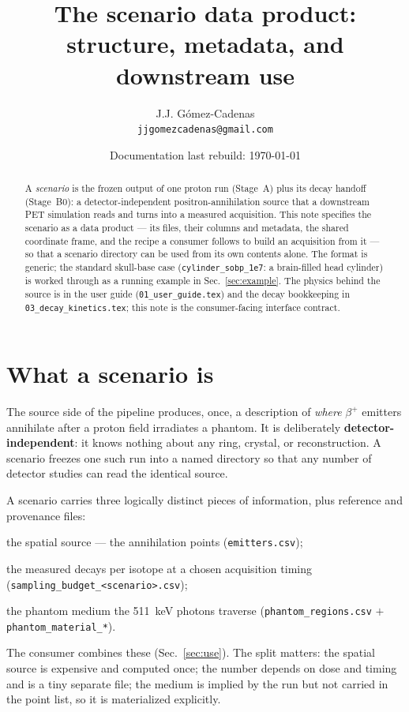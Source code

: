\documentclass[11pt]{article}
\title{The scenario data product:\\
structure, metadata, and downstream use}
\author{J.J. G\'omez-Cadenas\\\texttt{jjgomezcadenas@gmail.com}}
\date{Documentation last rebuild: \today}
\newcommand{\file}[1]{\texttt{#1}}
\begin{document}
\maketitle

\begin{abstract}
A \emph{scenario} is the frozen output of one proton run (Stage~A) plus its
decay handoff (Stage~B0): a detector-independent positron-annihilation source
that a downstream PET simulation reads and turns into a measured acquisition.
This note specifies the scenario as a data product --- its files, their columns
and metadata, the shared coordinate frame, and the recipe a consumer follows to
build an acquisition from it --- so that a scenario directory can be used from
its own contents alone. The format is generic; the standard skull-base case
(\file{cylinder\_sobp\_1e7}: a brain-filled head cylinder) is worked through as a
running example in Sec.~\ref{sec:example}. The physics behind the source is in
the user guide (\file{01\_user\_guide.tex}) and the decay bookkeeping in
\file{03\_decay\_kinetics.tex}; this note is the consumer-facing interface contract.
\end{abstract}

\section{What a scenario is}

The source side of the pipeline produces, once, a description of \emph{where}
$\beta^{+}$ emitters annihilate after a proton field irradiates a phantom. It is
deliberately \textbf{detector-independent}: it knows nothing about any ring,
crystal, or reconstruction. A scenario freezes one such run into a named
directory so that any number of detector studies can read the identical source.

A scenario carries three logically distinct pieces of information, plus
reference and provenance files:
\begin{description}[leftmargin=1.6em]
  \item[\emph{where}] the spatial source --- the annihilation points
    (\file{emitters.csv});
  \item[\emph{how many}] the measured decays per isotope at a chosen acquisition
    timing (\file{sampling\_budget\_<scenario>.csv});
  \item[\emph{through what}] the phantom medium the \SI{511}{keV} photons
    traverse (\file{phantom\_regions.csv} $+$ \file{phantom\_material\_*}).
\end{description}
The consumer combines these (Sec.~\ref{sec:use}). The split matters: the spatial
source is expensive and computed once; the number depends on dose and timing and
is a tiny separate file; the medium is implied by the run but not carried in the
point list, so it is materialized explicitly.
\end{document}
